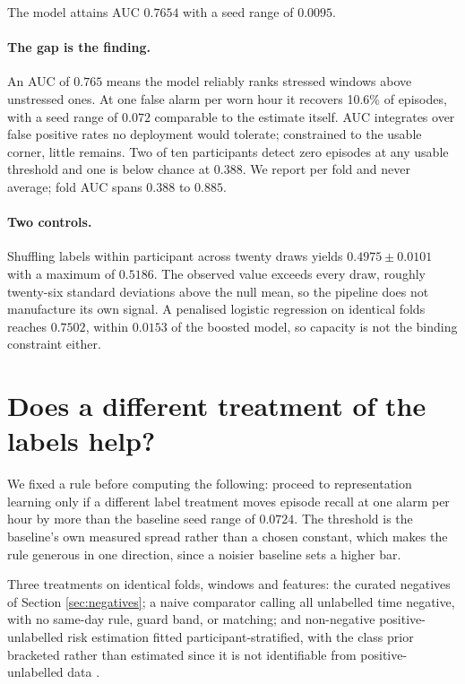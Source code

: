 The model attains AUC $0.7654$ with a seed range of $0.0095$.

\paragraph{The gap is the finding.} An AUC of $0.765$ means the model reliably
ranks stressed windows above unstressed ones. At one false alarm per worn hour
it recovers 10.6\% of episodes, with a seed range of $0.072$ comparable to the
estimate itself. AUC integrates over false positive rates no deployment would
tolerate; constrained to the usable corner, little remains. Two of ten
participants detect zero episodes at any usable threshold and one is below
chance at $0.388$. We report per fold and never average; fold AUC spans $0.388$
to $0.885$.

\paragraph{Two controls.} Shuffling labels within participant across twenty
draws yields $0.4975 \pm 0.0101$ with a maximum of $0.5186$. The observed value
exceeds every draw, roughly twenty-six standard deviations above the null mean,
so the pipeline does not manufacture its own signal. A penalised logistic
regression on identical folds reaches $0.7502$, within $0.0153$ of the boosted
model, so capacity is not the binding constraint either.

\section{Does a different treatment of the labels help?}
\label{sec:pu}

We fixed a rule before computing the following: proceed to representation
learning only if a different label treatment moves episode recall at one alarm
per hour by more than the baseline seed range of $0.0724$. The threshold is the
baseline's own measured spread rather than a chosen constant, which makes the
rule generous in one direction, since a noisier baseline sets a higher bar.

Three treatments on identical folds, windows and features: the curated
negatives of Section \ref{sec:negatives}; a naive comparator calling all
unlabelled time negative, with no same-day rule, guard band, or matching; and
non-negative positive-unlabelled risk estimation \cite{kiryo2017} fitted
participant-stratified, with the class prior bracketed rather than estimated
since it is not identifiable from positive-unlabelled data \cite{elkan2008}.

